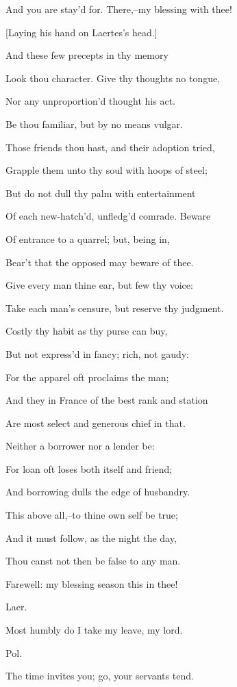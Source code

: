 \documentclass[12pt]{book}
\begin{document}
And you are stay'd for. There,--my blessing with thee!



[Laying his hand on Laertes's head.]



And these few precepts in thy memory

Look thou character. Give thy thoughts no tongue,

Nor any unproportion'd thought his act.

Be thou familiar, but by no means vulgar.

Those friends thou hast, and their adoption tried,

Grapple them unto thy soul with hoops of steel;

But do not dull thy palm with entertainment

Of each new-hatch'd, unfledg'd comrade. Beware

Of entrance to a quarrel; but, being in,

Bear't that the opposed may beware of thee.

Give every man thine ear, but few thy voice:

Take each man's censure, but reserve thy judgment.

Costly thy habit as thy purse can buy,

But not express'd in fancy; rich, not gaudy:

For the apparel oft proclaims the man;

And they in France of the best rank and station

Are most select and generous chief in that.

Neither a borrower nor a lender be:

For loan oft loses both itself and friend;

And borrowing dulls the edge of husbandry.

This above all,--to thine own self be true;

And it must follow, as the night the day,

Thou canst not then be false to any man.

Farewell: my blessing season this in thee!



Laer.

Most humbly do I take my leave, my lord.



Pol.

The time invites you; go, your servants tend.
\end{document}

